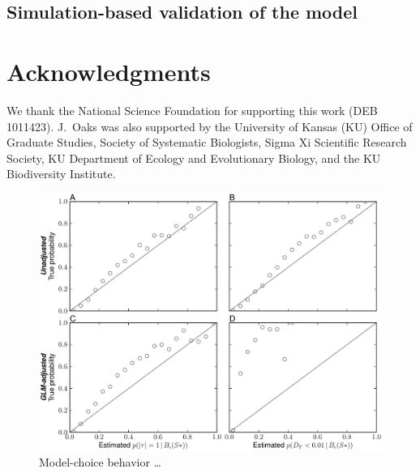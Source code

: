 \documentclass[letterpaper,12pt]{article}
\begin{document}
\begin{linenumbers}
\subsection*{Simulation-based validation of the model}


\section*{Acknowledgments}
We thank the National Science Foundation for supporting this work (DEB
1011423).
J.\ Oaks was also supported by the University of Kansas (KU) Office of Graduate
Studies, Society of Systematic Biologists, Sigma Xi Scientific Research
Society, KU Department of Ecology and Evolutionary Biology, and the KU
Biodiversity Institute.



\newpage
\singlespacing

\renewcommand\listfigurename{Figure Captions}
\renewcommand\cftdotsep{\cftnodots}
\setlength\cftbeforefigskip{10pt}
\listoffigures


\end{linenumbers}

\newpage
\singlespacing


\clearpage

\newpage

\begin{figure}[hbtp]
    \captionsetup{listformat=figList}
    \centering
    \includegraphics[width=1.0\textwidth]{../../validation/results/dpp/pymsbayes-results/plots/prior-dpp_prior-dpp_mc_behavior.pdf}
    \caption{
        Model-choice behavior \ldots
    }
    \label{fig_dpp_dpp_val_mc}
\end{figure}
\end{document}
